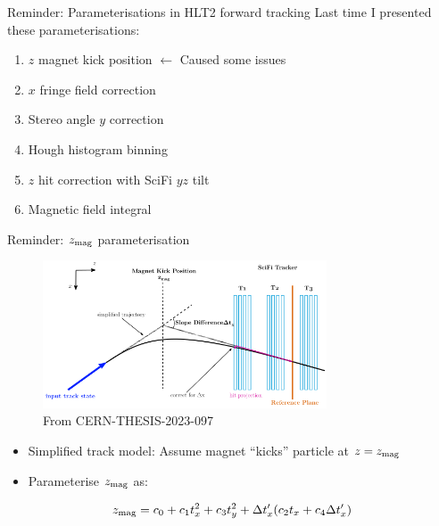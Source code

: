 \documentclass[xcolor={dvipsnames}]{beamer}
\begin{document}
\begin{frame}{Reminder: Parameterisations in HLT2 forward tracking}
  \vspace{0.0cm}
  {\large Last time I presented these parameterisations:}
  \vspace{0.2cm}
  \begin{enumerate}
    \setlength\itemsep{0.5em}
    \item{$z$ magnet kick position $\leftarrow$ Caused some issues}
    \item{$x$ fringe field correction}
    \item{Stereo angle $y$ correction}
    \item{Hough histogram binning}
    \item{$z$ hit correction with SciFi $yz$ tilt}
    \item{Magnetic field integral}
  \end{enumerate}
\end{frame}

\begin{frame}{Reminder: $z_{\rm mag}$ parameterisation}
  \vspace{0.0cm}
  \begin{figure}[htb]
    \centering
    \includegraphics[width=0.75\textwidth]{Plots/MagnetKinkPosition.png}
    \caption*{\small From CERN-THESIS-2023-097}
  \end{figure}
  \begin{itemize}
    \item{Simplified track model: Assume magnet ``kicks'' particle at $z = z_{\rm mag}$}
    \item{Parameterise $z_{\rm mag}$ as:}
  \end{itemize}
  \begin{equation*}
    z_{\rm mag} = c_0 + c_1t_x^2 + c_3t_y^2 + \Delta t_x^\prime(c_2t_x + c_4\Delta t_x^\prime)
  \end{equation*}
\end{frame}
\end{document}
